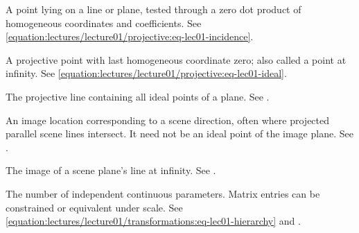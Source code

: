 \documentclass[letterpaper,11pt,english,openany,oneside]{jupyterBook}
\begin{document}
\begin{description}
\sphinxAtStartPar
A point lying on a line or plane, tested through a zero dot product of homogeneous coordinates and coefficients. See \eqref{equation:lectures/lecture01/projective:eq-lec01-incidence}.

\sphinxAtStartPar
A projective point with last homogeneous coordinate zero; also called a point at infinity. See \eqref{equation:lectures/lecture01/projective:eq-lec01-ideal}.

\sphinxAtStartPar
The projective line containing all ideal points of a plane. See {\hyperref[\detokenize{lectures/lecture01/projective:lec01-projective}]{}}.

\sphinxAtStartPar
An image location corresponding to a scene direction, often where projected parallel scene lines intersect. It need not be an ideal point of the image plane. See {\hyperref[\detokenize{lectures/lecture01/projective:lec01-projective}]{}}.

\sphinxAtStartPar
The image of a scene plane’s line at infinity. See {\hyperref[\detokenize{lectures/lecture01/projective:lec01-projective}]{}}.

\sphinxAtStartPar
The number of independent continuous parameters. Matrix entries can be constrained or equivalent under scale. See \eqref{equation:lectures/lecture01/transformations:eq-lec01-hierarchy} and {\hyperref[\detokenize{lectures/lecture01/rotations:lec01-rotations}]{}}.


\end{description}
\end{document}
